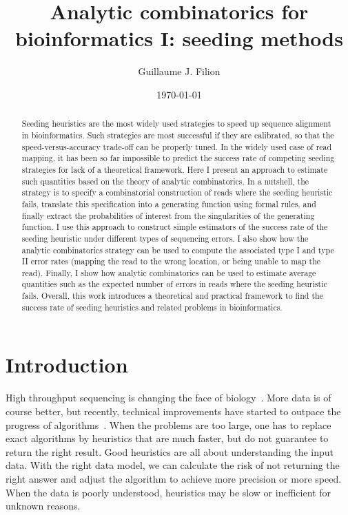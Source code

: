 \documentclass{article}
\title{Analytic combinatorics for bioinformatics I:
seeding methods}
\author[1,2]{Guillaume J. Filion}
\affil[1]{Genome Architecture, Gene Regulation, Stem Cells and Cancer
Programme, Center for Genomic Regulation (CRG), The Barcelona Institute of
Science and Technology, Dr. Aiguader 88, Barcelona 08003, Spain.}
\affil[2]{University Pompeu Fabra, Doctor Aiguader, 08003 Barcelona,
Spain.}
\date{\today}
\begin{document}
\maketitle

\begin{abstract}
Seeding heuristics are the most widely used strategies to speed up
sequence alignment in bioinformatics. Such strategies are most successful
if they are calibrated, so that the speed-versus-accuracy trade-off can be
properly tuned. In the widely used case of read mapping, it has been so
far impossible to predict the success rate of competing seeding strategies
for lack of a theoretical framework. Here I present an approach to
estimate such quantities based on the theory of analytic combinatorics. In
a nutshell, the strategy is to specify a combinatorial construction of
reads where the seeding heuristic fails, translate this specification into
a generating function using formal rules, and finally extract the
probabilities of interest from the singularities of the generating
function. I use this approach to construct simple estimators of the
success rate of the seeding heuristic under different types of sequencing
errors. I also show how the analytic combinatorics strategy can be used to
compute the associated type I and type II error rates (mapping the read to
the wrong location, or being unable to map the read). Finally, I show how
analytic combinatorics can be used to estimate average quantities such as
the expected number of errors in reads where the seeding heuristic fails.
Overall, this work introduces a theoretical and practical framework to
find the success rate of seeding heuristics and related problems in
bioinformatics.
\end{abstract}



\section{Introduction}

High throughput sequencing is changing the face of
biology~\cite{pmid26000844, pmid27184599}. More data is of course better,
but recently, technical improvements have started to outpace the progress
of algorithms~\cite{Quilez136358}. When the problems are too large, one
has to replace exact algorithms by heuristics that are much faster, but do
not guarantee to return the right result. Good heuristics are all about
understanding the input data. With the right data model, we can calculate
the risk of not returning the right answer and adjust the algorithm to
achieve more precision or more speed. When the data is poorly understood,
heuristics may be slow or inefficient for unknown reasons.
\end{document}
